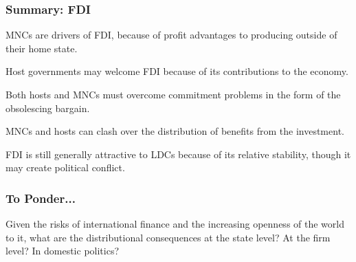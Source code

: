 \documentclass{beamer}
\begin{document}
\begin{frame} 
	\frametitle{\LARGE{Summary: FDI}}
	\begin{itemize}
		\large{
			\item MNCs are drivers of FDI, because of profit advantages to producing outside of their home state.  \pause 
			
			\item Host governments may welcome FDI because of its contributions to the economy. \pause 
			
			\item Both hosts and MNCs must overcome commitment problems in the form of the obsolescing bargain. \pause 
			
			\item MNCs and hosts can clash over the distribution of benefits from the investment. \pause 
			
			\item FDI is still generally attractive to LDCs because of its relative stability, though it may create political conflict.
		}
	\end{itemize}
\end{frame}

\begin{frame} 
\frametitle{\LARGE{To Ponder...}}
    \centering
    \Large{Given the risks of international finance and the increasing openness of the world to it, what are the distributional consequences at the state level? At the firm level? In domestic politics? }
\end{frame}
\end{document}
